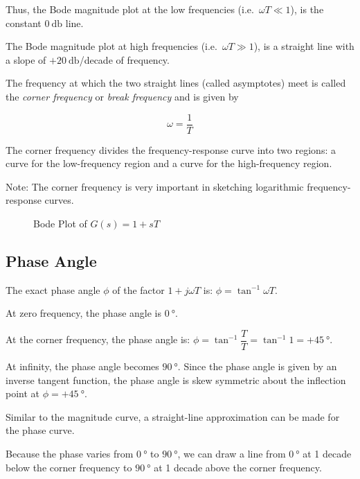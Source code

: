 \documentclass[
  14pt,
  a4paper,
  oneside,
  open=any,
  a4paper,
  14pt]{report}
\begin{document}
Thus, the Bode magnitude plot at the low frequencies
(i.e.~\(\omega T \ll 1\)), is the constant \(\SI{0}{\decibel}\) line.

The Bode magnitude plot at high frequencies (i.e.~\(\omega T \gg 1\)),
is a straight line with a slope of \(+\SI{20}{\decibel}\)/decade of
frequency.

The frequency at which the two straight lines (called asymptotes) meet
is called the \emph{corner frequency} or \emph{break frequency} and is
given by

\[
\omega = \dfrac{1}{T}
\]

The corner frequency divides the frequency-response curve into two
regions: a curve for the low-frequency region and a curve for the
high-frequency region.

Note: The corner frequency is very important in sketching logarithmic
frequency-response curves.

\begin{figure}

\centering{



}

\caption{\label{fig-bode-plot-simple-zero}Bode Plot of \(G(s) = 1+sT\)}

\end{figure}%

\subsection{Phase Angle}\label{phase-angle}

The exact phase angle \(\phi\) of the factor \(1+j\omega T\) is:
\(\phi =\tan^{-1} \omega T\).

At zero frequency, the phase angle is \(\SI{0}{\degree}\).

At the corner frequency, the phase angle is:
\(\phi = \tan^{-1} \dfrac{T}{T} = \tan^{-1} 1 = +\SI{45}{\degree}\).

At infinity, the phase angle becomes \(\SI{90}{\degree}\). Since the
phase angle is given by an inverse tangent function, the phase angle is
skew symmetric about the inflection point at \(\phi=+\SI{45}{\degree}\).

Similar to the magnitude curve, a straight-line approximation can be
made for the phase curve.

Because the phase varies from \(\SI{0}{\degree}\) to
\(\SI{90}{\degree}\), we can draw a line from \(\SI{0}{\degree}\) at 1
decade below the corner frequency to \(\SI{90}{\degree}\) at 1 decade
above the corner frequency.
\end{document}
